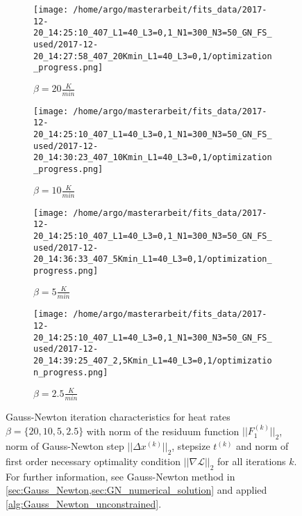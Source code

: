 \documentclass{scrartcl}[12pt, halfparskip]
\numberwithin{equation}{section}
\numberwithin{figure}{section}
\numberwithin{table}{section}
\begin{document}
\begin{figure}[H]
	\begin{subfigure}{0.49\textwidth}
		\texttt{[image: /home/argo/masterarbeit/fits\_data/2017-12-20\_14:25:10\_407\_L1=40\_L3=0,1\_N1=300\_N3=50\_GN\_FS\_used/2017-12-20\_14:27:58\_407\_20Kmin\_L1=40\_L3=0,1/optimization\_progress.png]}
		\caption{$\beta = 20 \frac{K}{min}$}
	\end{subfigure}
	\begin{subfigure}{0.49\textwidth}
		\texttt{[image: /home/argo/masterarbeit/fits\_data/2017-12-20\_14:25:10\_407\_L1=40\_L3=0,1\_N1=300\_N3=50\_GN\_FS\_used/2017-12-20\_14:30:23\_407\_10Kmin\_L1=40\_L3=0,1/optimization\_progress.png]}
		\caption{$\beta = 10 \frac{K}{min}$}
	\end{subfigure}
	\begin{subfigure}{0.49\textwidth}
		\texttt{[image: /home/argo/masterarbeit/fits\_data/2017-12-20\_14:25:10\_407\_L1=40\_L3=0,1\_N1=300\_N3=50\_GN\_FS\_used/2017-12-20\_14:36:33\_407\_5Kmin\_L1=40\_L3=0,1/optimization\_progress.png]}
		\caption{$\beta = 5 \frac{K}{min}$}
	\end{subfigure}
	\begin{subfigure}{0.49\textwidth}
		\texttt{[image: /home/argo/masterarbeit/fits\_data/2017-12-20\_14:25:10\_407\_L1=40\_L3=0,1\_N1=300\_N3=50\_GN\_FS\_used/2017-12-20\_14:39:25\_407\_2,5Kmin\_L1=40\_L3=0,1/optimization\_progress.png]}
		\caption{$\beta = 2.5 \frac{K}{min}$}
	\end{subfigure}
	\caption{Gauss-Newton iteration characteristics for heat rates $\beta = \{ 20, 10, 5, 2.5 \}$ with norm of the residuum function $||F_1^{(k)}||_2$, norm of Gauss-Newton step $||\Delta x^{(k)}||_2$, stepsize $t^{(k)}$ and norm of first order necessary optimality condition $|| \nabla \mathcal{L} ||_2$ for all iterations $k$.  \\
	For further information, see Gauss-Newton method in \cref{sec:Gauss_Newton,sec:GN_numerical_solution} and applied \cref{alg:Gauss_Newton_unconstrained}.} 
	\label{fig:optimization_progress_FS_1}
\end{figure}
\end{document}
